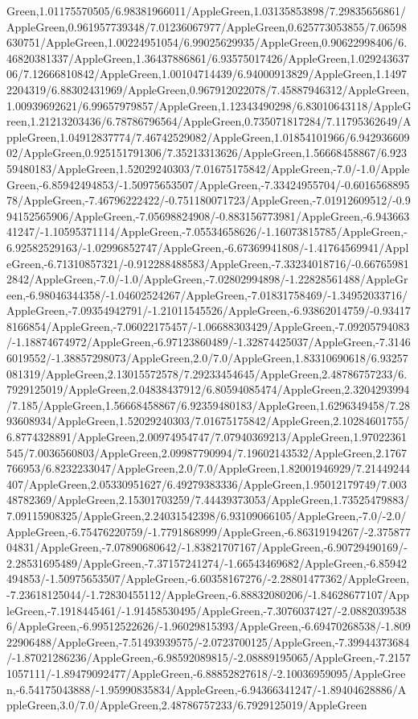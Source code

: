 {\begin{tikzternal}
Green,1.01175570505/6.98381966011/AppleGreen,1.03135853898/7.29835656861/AppleGreen,0.961957739348/7.01236067977/AppleGreen,0.625773053855/7.06598630751/AppleGreen,1.00224951054/6.99025629935/AppleGreen,0.90622998406/6.46820381337/AppleGreen,1.36437886861/6.93575017426/AppleGreen,1.02924363706/7.12666810842/AppleGreen,1.00104714439/6.94000913829/AppleGreen,1.14972204319/6.88302431969/AppleGreen,0.967912022078/7.45887946312/AppleGreen,1.00939692621/6.99657979857/AppleGreen,1.12343490298/6.83010643118/AppleGreen,1.21213203436/6.78786796564/AppleGreen,0.735071817284/7.11795362649/AppleGreen,1.04912837774/7.46742529082/AppleGreen,1.01854101966/6.94293660902/AppleGreen,0.925151791306/7.35213313626/AppleGreen,1.56668458867/6.92359480183/AppleGreen,1.52029240303/7.01675175842/AppleGreen,-7.0/-1.0/AppleGreen,-6.85942494853/-1.50975653507/AppleGreen,-7.33424955704/-0.601656889578/AppleGreen,-7.46796222422/-0.751180071723/AppleGreen,-7.01912609512/-0.994152565906/AppleGreen,-7.05698824908/-0.883156773981/AppleGreen,-6.94366341247/-1.10595371114/AppleGreen,-7.05534658626/-1.16073815785/AppleGreen,-6.92582529163/-1.02996852747/AppleGreen,-6.67369941808/-1.41764569941/AppleGreen,-6.71310857321/-0.912288488583/AppleGreen,-7.33234018716/-0.667659812842/AppleGreen,-7.0/-1.0/AppleGreen,-7.02802994898/-1.22828561488/AppleGreen,-6.98046344358/-1.04602524267/AppleGreen,-7.01831758469/-1.34952033716/AppleGreen,-7.09354942791/-1.21011545526/AppleGreen,-6.93862014759/-0.934178166854/AppleGreen,-7.06022175457/-1.06688303429/AppleGreen,-7.09205794083/-1.18874674972/AppleGreen,-6.97123860489/-1.32874425037/AppleGreen,-7.31466019552/-1.38857298073/AppleGreen,2.0/7.0/AppleGreen,1.83310690618/6.93257081319/AppleGreen,2.13015572578/7.29233454645/AppleGreen,2.48786757233/6.7929125019/AppleGreen,2.04838437912/6.80594085474/AppleGreen,2.3204293994/7.185/AppleGreen,1.56668458867/6.92359480183/AppleGreen,1.6296349458/7.2893608934/AppleGreen,1.52029240303/7.01675175842/AppleGreen,2.10284601755/6.8774328891/AppleGreen,2.00974954747/7.07940369213/AppleGreen,1.97022361545/7.0036560803/AppleGreen,2.09987790994/7.19602143532/AppleGreen,2.1767766953/6.8232233047/AppleGreen,2.0/7.0/AppleGreen,1.82001946929/7.21449244407/AppleGreen,2.05330951627/6.49279383336/AppleGreen,1.95012179749/7.00348782369/AppleGreen,2.15301703259/7.44439373053/AppleGreen,1.73525479883/7.09115908325/AppleGreen,2.24031542398/6.93109066105/AppleGreen,-7.0/-2.0/AppleGreen,-6.75476220759/-1.7791868999/AppleGreen,-6.86319194267/-2.37587704831/AppleGreen,-7.07890680642/-1.83821707167/AppleGreen,-6.90729490169/-2.28531695489/AppleGreen,-7.37157241274/-1.66543469682/AppleGreen,-6.85942494853/-1.50975653507/AppleGreen,-6.60358167276/-2.28801477362/AppleGreen,-7.23618125044/-1.72830455112/AppleGreen,-6.88832080206/-1.84628677107/AppleGreen,-7.1918445461/-1.91458530495/AppleGreen,-7.3076037427/-2.08820395386/AppleGreen,-6.99512522626/-1.96029815393/AppleGreen,-6.69470268538/-1.80922906488/AppleGreen,-7.51493939575/-2.0723700125/AppleGreen,-7.39944373684/-1.87021286236/AppleGreen,-6.98592089815/-2.08889195065/AppleGreen,-7.21571057111/-1.89479092477/AppleGreen,-6.88852827618/-2.10036959095/AppleGreen,-6.54175043888/-1.95990835834/AppleGreen,-6.94366341247/-1.89404628886/AppleGreen,3.0/7.0/AppleGreen,2.48786757233/6.7929125019/AppleGreen
\end{tikzternal}}
